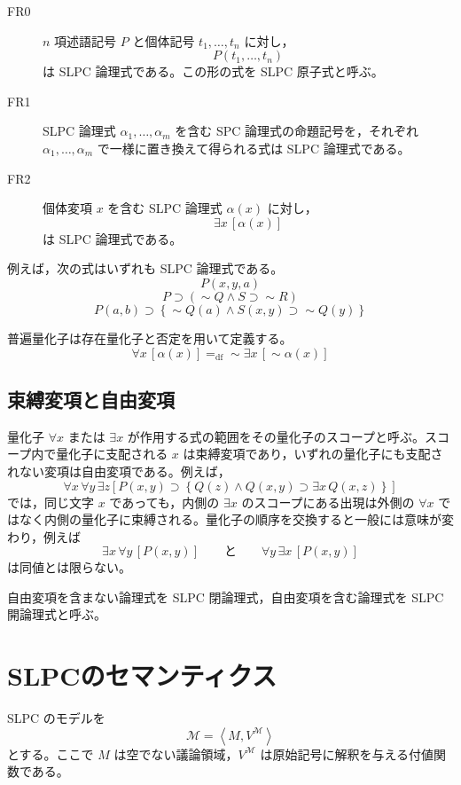\documentclass[../main.tex]{subfiles}
\begin{document}
\begin{description}
  \item[FR0] \(n\) 項述語記号 \(P\) と個体記号 \(t_1,\ldots,t_n\) に対し，
  \[
    P(t_1,\ldots,t_n)
  \]
  は SLPC 論理式である。この形の式を SLPC 原子式と呼ぶ。

  \item[FR1] SLPC 論理式 \(\alpha_1,\ldots,\alpha_m\) を含む SPC 論理式の命題記号を，それぞれ \(\alpha_1,\ldots,\alpha_m\) で一様に置き換えて得られる式は SLPC 論理式である。

  \item[FR2] 個体変項 \(x\) を含む SLPC 論理式 \(\alpha(x)\) に対し，
  \[
    \exists x\,[\alpha(x)]
  \]
  は SLPC 論理式である。
\end{description}

例えば，次の式はいずれも SLPC 論理式である。
\[
  P(x,y,a)
\]
\[
  P \supset (\sim Q \land S \supset \sim R)
\]
\[
  P(a,b) \supset
  \left\{
    \sim Q(a) \land S(x,y) \supset \sim Q(y)
  \right\}
\]

普遍量化子は存在量化子と否定を用いて定義する。
\[
  \forall x\,[\alpha(x)]
  =_{\mathrm{df}}
  \sim \exists x\,[\sim \alpha(x)]
\]

\subsection{束縛変項と自由変項}

量化子 \(\forall x\) または \(\exists x\) が作用する式の範囲をその量化子のスコープと呼ぶ。スコープ内で量化子に支配される \(x\) は束縛変項であり，いずれの量化子にも支配されない変項は自由変項である。例えば，
\[
  \forall x\,\forall y\,\exists z
  \left[
    P(x,y) \supset
    \left\{
      Q(z) \land Q(x,y) \supset \exists x\,Q(x,z)
    \right\}
  \right]
\]
では，同じ文字 \(x\) であっても，内側の \(\exists x\) のスコープにある出現は外側の \(\forall x\) ではなく内側の量化子に束縛される。量化子の順序を交換すると一般には意味が変わり，例えば
\[
  \exists x\,\forall y\,[P(x,y)]
  \qquad\text{と}\qquad
  \forall y\,\exists x\,[P(x,y)]
\]
は同値とは限らない。

自由変項を含まない論理式を SLPC 閉論理式，自由変項を含む論理式を SLPC 開論理式と呼ぶ。

\section{SLPCのセマンティクス}

SLPC のモデルを
\[
  \mathcal{M}
  =
  \left\langle
    M,V^{\mathcal{M}}
  \right\rangle
\]
とする。ここで \(M\) は空でない議論領域，\(V^{\mathcal{M}}\) は原始記号に解釈を与える付値関数である。
\end{document}
